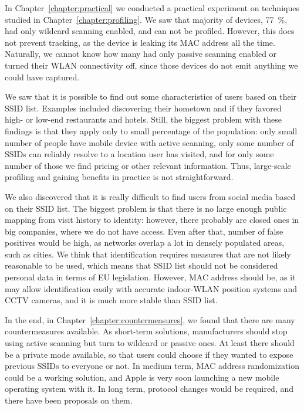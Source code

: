 \documentclass[12pt,a4paper,oneside,pdftex]{report}
\begin{document}
In Chapter~\ref{chapter:practical} we conducted a practical experiment on techniques studied in Chapter~\ref{chapter:profiling}. We saw that majority of devices, 77~\%, had only wildcard scanning enabled, and can not be profiled. However, this does not prevent tracking, as the device is leaking its MAC address all the time. Naturally, we cannot know how many had only passive scanning enabled or turned their WLAN connectivity off, since those devices do not emit anything we could have captured.

We saw that it is possible to find out some characteristics of users based on their SSID list. Examples included discovering their hometown and if they favored high- or low-end restaurants and hotels. Still, the biggest problem with these findings is that they apply only to small percentage of the population: only small number of people have mobile device with active scanning, only some number of SSIDs can reliably resolve to a location user has visited, and for only some number of those we find pricing or other relevant information. Thus, large-scale profiling and gaining benefits in practice is not straightforward.

We also discovered that it is really difficult to find users from social media based on their SSID list. The biggest problem is that there is no large enough public mapping from visit history to identity: however, there probably are closed ones in big companies, where we do not have access. Even after that, number of false positives would be high, as networks overlap a lot in densely populated areas, such as cities. We think that identification requires measures that are not likely reasonable to be used, which means that SSID list should not be considered personal data in terms of EU legislation. However, MAC address should be, as it may allow identification easily with accurate indoor-WLAN position systems and CCTV cameras, and it is much more stable than SSID list.

In the end, in Chapter~\ref{chapter:countermeasures}, we found that there are many countermeasures available. As short-term solutions, manufacturers should stop using active scanning but turn to wildcard or passive ones. At least there should be a private mode available, so that users could choose if they wanted to expose previous SSIDs to everyone or not. In medium term, MAC address randomization could be a working solution, and Apple is very soon launching a new mobile operating system with it. In long term, protocol changes would be required, and there have been proposals on them.
\end{document}
